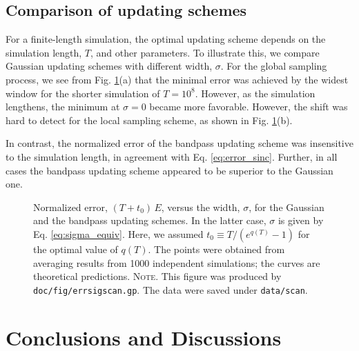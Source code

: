 \documentclass[reprint, floatfix]{revtex4-1}
\newcommand{\note}[1]{{\color{DarkGreen}\footnotesize \textsc{Note.} #1}}
\begin{document}
\subsection{Comparison of updating schemes}



For a finite-length simulation,
the optimal updating scheme
depends on the simulation length, $T$,
and other parameters.
%
To illustrate this,
we compare Gaussian updating schemes
with different width, $\sigma$.
%
For the global sampling process,
we see from Fig. \ref{fig:errsigscan}(a)
that the minimal error was achieved
by the widest window for the shorter simulation
of $T = 10^8$.
%
However, as the simulation lengthens,
the minimum at $\sigma = 0$ became more favorable.
%
However,
the shift was hard to detect
for the local sampling scheme,
as shown in Fig. \ref{fig:errsigscan}(b).


In contrast,
the normalized error of the bandpass updating scheme
was insensitive to the simulation length,
in agreement with Eq. \eqref{eq:error_sinc}.
%
Further, in all cases the bandpass updating scheme
appeared to be superior to the Gaussian one.



\begin{figure}[h]
\begin{center}
  \caption{
    \label{fig:errsigscan}
    Normalized error, $(T + t_0) \, E$,
    versus the width, $\sigma$,
    for the Gaussian
    and the bandpass updating schemes.
    In the latter case,
    $\sigma$ is given by Eq. \eqref{eq:sigma_equiv}.
    Here, we assumed $t_0 \equiv T/(e^{q(T)} - 1)$
    for the optimal value of $q(T)$.
    The points were obtained from averaging results
    from 1000 independent simulations;
    the curves are theoretical predictions.
    \note{This figure was produced by
      \texttt{doc/fig/errsigscan.gp}.
      The data were saved under
      \texttt{data/scan}.
    }
  }
\end{center}
\end{figure}





\section{\label{sec:conclusion}
Conclusions and Discussions}
\end{document}

